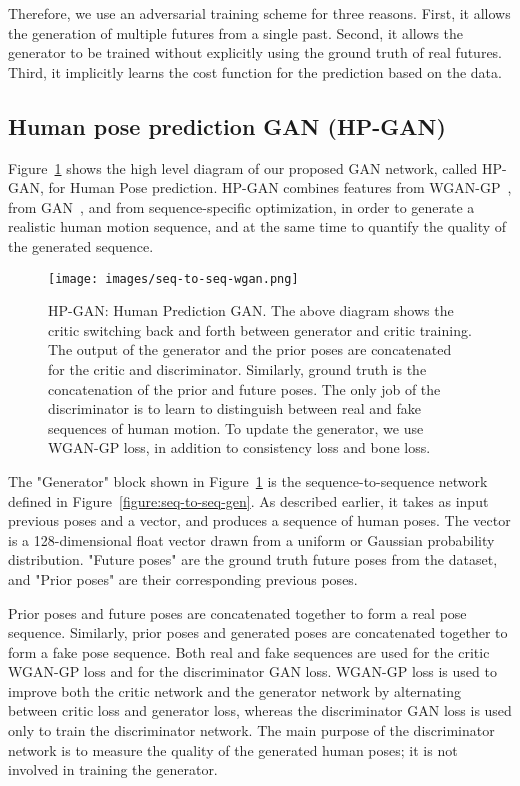 \documentclass[10pt,twocolumn,letterpaper]{article}
\begin{document}
Therefore, we use an adversarial training scheme for three reasons. First, it allows the generation of multiple futures from a single past. Second, it allows the generator to be trained without explicitly using the ground truth of real futures. Third, it implicitly learns the cost function for the prediction based on the data. 

\subsection{Human pose prediction GAN (HP-GAN)}
Figure~\ref{figure:seq-to-seq-wgan} shows the high level diagram of our proposed GAN network, called HP-GAN, for Human Pose prediction. HP-GAN combines features from WGAN-GP~\cite{corr2017:Ishaan}, from GAN~\cite{nips2014:Goodfellow}, and from sequence-specific optimization, in order to generate a realistic human motion sequence, and at the same time to quantify the quality of the generated sequence. 

\begin{figure}[ht]
\centering
\texttt{[image: images/seq-to-seq-wgan.png]}
\caption{HP-GAN: Human Prediction GAN. The above diagram shows the critic switching back and forth between generator and critic training. The output of the generator and the prior poses are concatenated for the critic and discriminator.  Similarly, ground truth is the concatenation of the prior and future poses. The only job of the discriminator is to learn to distinguish between real and fake sequences of human motion. To update the generator, we use WGAN-GP loss, in addition to consistency loss and bone loss.}
\label{figure:seq-to-seq-wgan}
\end{figure}

The "Generator" block shown in Figure~\ref{figure:seq-to-seq-wgan} is the sequence-to-sequence network defined in Figure~\ref{figure:seq-to-seq-gen}. As described earlier, it takes as input previous poses and a  vector, and produces a sequence of human poses. The  vector is a 128-dimensional float vector drawn from a uniform or Gaussian probability distribution. "Future poses" are the ground truth future poses from the dataset, and "Prior poses" are their corresponding previous poses.

Prior poses and future poses are concatenated together to form a real pose sequence. Similarly, prior poses and generated poses are concatenated together to form a fake pose sequence. Both real and fake sequences are used for the critic WGAN-GP loss and for the discriminator GAN loss. WGAN-GP loss is used to improve both the critic network and the generator network by alternating between critic loss and generator loss, whereas the discriminator GAN loss is used only to train the discriminator network. The main purpose of the discriminator network is to measure the quality of the generated human poses; it is not involved in training the generator.
\end{document}
